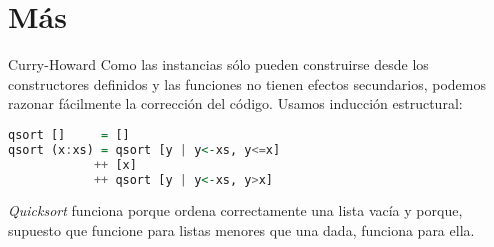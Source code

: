 \section{Más}

\begin{frame}[fragile]{Curry-Howard}
  Como las instancias sólo pueden construirse desde los constructores definidos
  y las funciones no tienen efectos secundarios, podemos razonar fácilmente la
  corrección del código. Usamos inducción estructural:

  \begin{lstlisting}[language=haskell]
qsort []     = []
qsort (x:xs) = qsort [y | y<-xs, y<=x]
            ++ [x]
            ++ qsort [y | y<-xs, y>x]
  \end{lstlisting}

  \textit{Quicksort} funciona porque ordena correctamente una lista vacía y porque, supuesto
  que funcione para listas menores que una dada, funciona para ella.
\end{frame}
